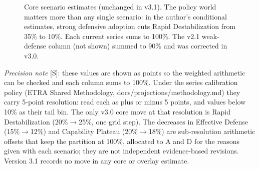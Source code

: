 \documentclass[11pt,letterpaper]{article}
\begin{document}
\begin{figure}[!htb]
\centering
{}
\caption{Core scenario estimates (unchanged in v3.1). The policy world matters more than any single scenario: in the author's conditional estimates, strong defensive adoption cuts Rapid Destabilization from 35\% to 10\%. Each current series sums to 100\%. The v2.1 weak-defense column (not shown) summed to 90\% and was corrected in v3.0.}
\label{fig:scenarios}
\end{figure}

\textit{Precision note} [S]: these values are shown as points so the weighted arithmetic can be checked and each column sums to 100\%. Under the series calibration policy (ETRA Shared Methodology, docs/projections/methodology.md) they carry 5-point resolution: read each as plus or minus 5 points, and values below 10\% as their tail bin. The only v3.0 core move at that resolution is Rapid Destabilization (20\%$\rightarrow$25\%, one grid step). The decreases in Effective Defense (15\%$\rightarrow$12\%) and Capability Plateau (20\%$\rightarrow$18\%) are sub-resolution arithmetic offsets that keep the partition at 100\%, allocated to A and D for the reasons given with each scenario; they are not independent evidence-based revisions. Version 3.1 records no move in any core or overlay estimate.
\end{document}
